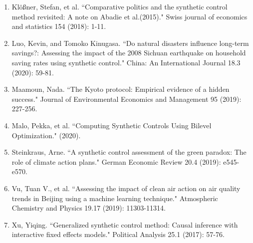 \documentclass[12pt,a4paper,draft]{article}
\begin{document}
\begin{enumerate}
    \item Klößner, Stefan, et al. ``Comparative politics and the synthetic control method revisited: A note on Abadie et al.(2015)." Swiss journal of economics and statistics 154 (2018): 1-11.
    \item Luo, Kevin, and Tomoko Kinugasa. ``Do natural disasters influence long-term savings?: Assessing the impact of the 2008 Sichuan earthquake on household saving rates using synthetic control." China: An International Journal 18.3 (2020): 59-81.
    \item Maamoun, Nada. ``The Kyoto protocol: Empirical evidence of a hidden success." Journal of Environmental Economics and Management 95 (2019): 227-256.
    \item Malo, Pekka, et al. ``Computing Synthetic Controls Using Bilevel Optimization." (2020).
    \item Steinkraus, Arne. ``A synthetic control assessment of the green paradox: The role of climate action plans." German Economic Review 20.4 (2019): e545-e570.
    \item Vu, Tuan V., et al. ``Assessing the impact of clean air action on air quality trends in Beijing using a machine learning technique." Atmospheric Chemistry and Physics 19.17 (2019): 11303-11314.
    \item Xu, Yiqing. ``Generalized synthetic control method: Causal inference with interactive fixed effects models." Political Analysis 25.1 (2017): 57-76.
\end{enumerate}
\end{document}
